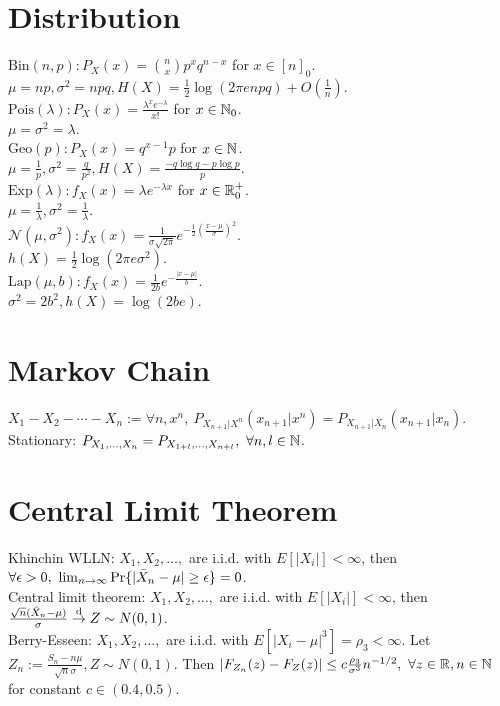 \section{Distribution}

$\mathrm{Bin}(n, p): P_X(x)=\binom nxp^xq^{n-x}$ for $x\in[n]_0$.\\
$\mu=np, \sigma^2=npq, H(X)=\frac12\log(2\pi enpq)+O(\frac1n)$.\\
$\mathrm{Pois}(\lambda): P_X(x)=\frac{\lambda^xe^{-\lambda}}{x!}$ for $x\in\mathbb{N}_0$.\\
$\mu=\sigma^2=\lambda$.\\
$\mathrm{Geo}(p): P_X(x)=q^{x-1}p$ for $x\in\mathbb{N}$.\\
$\mu=\frac1p, \sigma^2=\frac q{p^2}, H(X)=\frac{-q\log q-p\log p}p$.\\
$\mathrm{Exp}(\lambda): f_X(x)=\lambda e^{-\lambda x}$ for $x\in\mathbb{R}^+_0$.\\
$\mu=\frac1\lambda, \sigma^2=\frac1\lambda$.\\
$\mathcal{N}(\mu, \sigma^2): f_X(x)=\frac1{\sigma\sqrt{2\pi}}e^{-\frac12\left(\frac{x-\mu}\sigma\right)^2}$.\\
$h(X)=\frac12\log(2\pi e\sigma^2)$.\\
$\mathrm{Lap}(\mu, b): f_X(x)=\frac1{2b}e^{-\frac{|x-\mu|}b}$.\\
$\sigma^2=2b^2, h(X)=\log(2be)$.

\section{Markov Chain}

$X_1-X_2-\cdots-X_n:=\forall n, x^n,\ P_{X_{n+1}|X^n}(x_{n+1}|x^n)=P_{X_{n+1}|X_n}(x_{n+1}|x_n)$.\\
Stationary: $P_{X_1, \dots, X_n}=P_{X_{1+l}, \dots, X_{n+l}},\ \forall n, l\in\mathbb{N}$.

\section{Central Limit Theorem}

Khinchin WLLN: $X_1, X_2, \dots, $ are i.i.d. with $E[|X_i|]<\infty$, then $\forall\epsilon>0,\ \lim_{n\to\infty}\P\{|\bar X_n-\mu|\geq\epsilon\}=0$.\\
Central limit theorem: $X_1, X_2, \dots, $ are i.i.d. with $E[|X_i|]<\infty$, then $\frac{\sqrt n(\bar X_n-\mu)}\sigma\overset{\text{d}}\to Z\sim N(0, 1)$.\\
Berry-Esseen: $X_1, X_2, \dots, $ are i.i.d. with $E[|X_i-\mu|^3]=\rho_3<\infty$. Let $Z_n:=\frac{S_n-n\mu}{\sqrt n\sigma}, Z\sim N(0, 1)$. Then $|F_{Z_n}(z)-F_Z(z)|\leq c\frac{\rho_3}{\sigma^3}n^{-1/2},\ \forall z\in\mathbb{R}, n\in\mathbb{N}$ for constant $c\in(0.4, 0.5)$.
